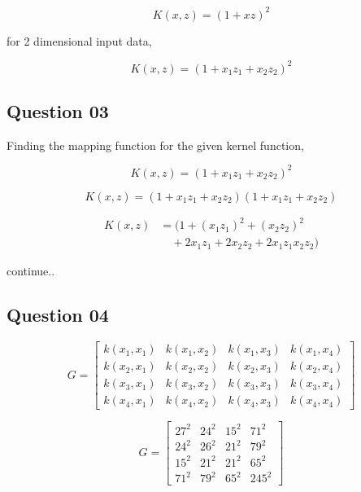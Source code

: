 \documentclass[11pt,a4paper]{article}
\begin{document}
\begin{equation}
    K(x,z) =  (1 + xz)^2   
\end{equation}

for 2 dimensional input data,

\begin{equation}
    K(x,z) =  (1 + x_1z_1 + x_2z_2)^2   
\end{equation}

\subsection{Question 03}

Finding the mapping function for the given kernel function,

\begin{equation}
    K(x,z) =  (1 + x_1z_1 + x_2z_2)^2 
\end{equation}

\begin{equation}
    K(x,z) =  (1 + x_1z_1 + x_2z_2)(1 + x_1z_1 + x_2z_2)
\end{equation}

\begin{align}
    K(x,z) &=  (1 + (x_1z_1)^2 + (x_2z_2)^2 \nonumber \\
    &\quad + 2x_1z_1 + 2x_2z_2 + 2x_1z_1x_2z_2)
\end{align}

continue..


\subsection{Question 04}


\begin{equation}
    G = 
    \begin{bmatrix}
        k(x_1,x_1) & k(x_1,x_2) & k(x_1,x_3) & k(x_1,x_4) \\
        k(x_2,x_1) & k(x_2,x_2) & k(x_2,x_3) & k(x_2,x_4) \\
        k(x_3,x_1) & k(x_3,x_2) & k(x_3,x_3) & k(x_3,x_4) \\
        k(x_4,x_1) & k(x_4,x_2) & k(x_4,x_3) & k(x_4,x_4) 
    \end{bmatrix}
\end{equation}

\begin{equation}
    G = 
    \begin{bmatrix}
        27^2 & 24^2 & 15^2 & 71^2 \\
        24^2 & 26^2 & 21^2 & 79^2 \\
        15^2 & 21^2 & 21^2 & 65^2 \\
        71^2 & 79^2 & 65^2 & 245^2
    \end{bmatrix}
\end{equation}
\end{document}
